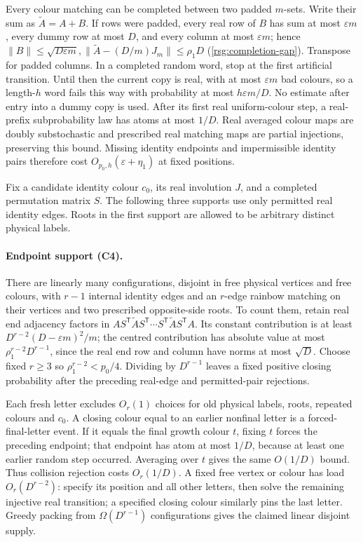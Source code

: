 Every colour matching can be completed between two padded $m$-sets. Write their sum as $\widetilde{A}=A+B$.  If rows were padded, every real row of $B$ has sum at most $\varepsilon{}m$, every dummy row at most $D$, and every column at most $\varepsilon{}m$; hence \label{rsg:completion-gap}$\|B\|\le\sqrt{D\varepsilon{}m},\|\widetilde{A}-(D/m)J_m\|\le\rho_1D$ \textup{(\ref{rsg:completion-gap})}. Transpose for padded columns.  In a completed random word, stop at
the first artificial transition.  Until then the current copy is
real, with at most $\varepsilon{}m$ bad colours, so a length-$h$ word fails this way with probability at most $h\varepsilon{}m/D$. No estimate after entry into a dummy copy is used.  After its first
real uniform-colour step, a real-prefix subprobability law has atoms
at most $1/D$.  Real averaged colour maps are doubly substochastic and prescribed real matching maps are partial injections, preserving
this bound.  Missing identity endpoints and impermissible identity
pairs therefore cost $O_{p_0,h}(\varepsilon+\eta_1)$ at fixed positions.

Fix a candidate identity colour $c_0$, its real involution $J$, and a completed permutation matrix $S$.  The following three supports use only permitted real identity edges.  Roots in the first support
are allowed to be arbitrary distinct physical labels.

\paragraph{Endpoint support (C4).}
There are linearly many configurations, disjoint in free physical
vertices and free colours, with $r-1$ internal identity edges and an $r$-edge rainbow matching on their vertices and two prescribed opposite-side roots.  To count them, retain real end adjacency
factors in $AS^{\mathsf{T}}\widetilde{A}S^{\mathsf{T}}\cdots{}S^{\mathsf{T}}\widetilde{A}S^{\mathsf{T}}A$. Its constant contribution is at least $D^{r-2}(D-\varepsilon{}m)^2/m$; the centred contribution has absolute value at most $\rho_1^{r-2}D^{r-1}$, since the real end row and column have norms at most $\sqrt{D}$.  Choose fixed $r\ge3$ so $\rho_1^{r-2}<p_0/4$.  Dividing by $D^{r-1}$ leaves a fixed positive closing probability after the preceding real-edge and
permitted-pair rejections.

Each fresh letter excludes $O_r(1)$ choices for old physical labels, roots, repeated colours and $c_0$.  A closing colour equal to an earlier nonfinal letter is a forced-final-letter event.  If it equals
the final growth colour $t$, fixing $t$ forces the preceding endpoint; that endpoint has atom at most $1/D$, because at least one earlier random step occurred.  Averaging over $t$ gives the same $O(1/D)$ bound.  Thus collision rejection costs $O_r(1/D)$. A fixed free vertex or colour has load $O_r(D^{r-2})$: specify its position and all other letters, then solve the remaining injective
real transition; a specified closing colour similarly pins the last
letter.  Greedy packing from $\Omega(D^{r-1})$ configurations gives the claimed linear disjoint supply.


